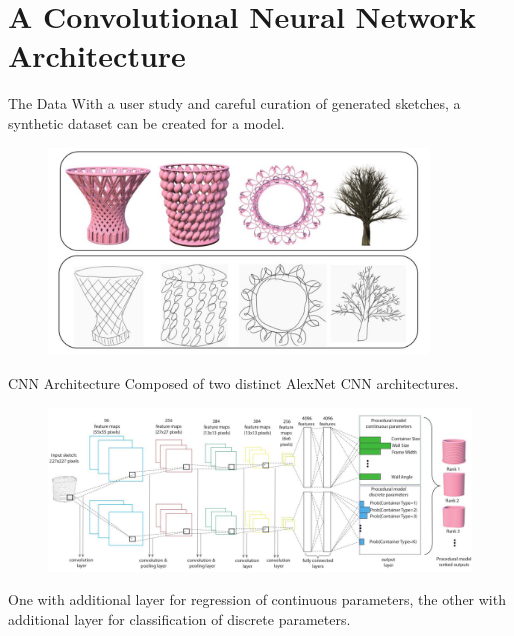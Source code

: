 \documentclass{beamer}
\begin{document}
    \section{A Convolutional Neural Network Architecture}
    
    \begin{frame}{The Data}
        With a user study and careful curation of generated sketches, a synthetic dataset can be created for a model.
        \begin{figure}
            \centering
            \includegraphics[width=0.9\textwidth]{images/user-sketch.jpg}
            \label{fig:user-sketch}
        \end{figure}
    \end{frame}
    
    \begin{frame}{CNN Architecture}
        Composed of two distinct AlexNet CNN architectures.
        \begin{figure}
            \centering
            \includegraphics[width=\textwidth]{images/architecture.jpg}
            \label{fig:architecture}
        \end{figure}
        One with additional layer for regression of continuous parameters, the other with additional layer for classification of discrete parameters.
    \end{frame}
    
\end{document}
